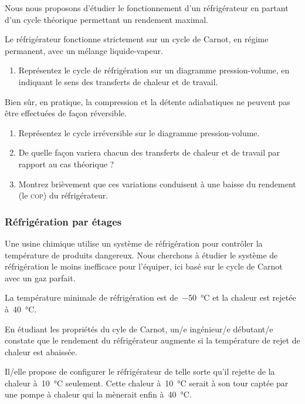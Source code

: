 	Nous nous proposons d’étudier le fonctionnement d’un réfrigérateur en partant d’un cycle théorique permettant un rendement maximal.
	
	Le réfrigérateur fonctionne strictement sur un cycle de Carnot, en régime permanent, avec un mélange liquide-vapeur.
	
	\begin{enumerate}
		\item Représentez le cycle de réfrigération sur un diagramme pression-volume, en indiquant le sens des transferts de chaleur et de travail.
	\end{enumerate}
	
	Bien sûr, en pratique, la compression et la détente adiabatiques ne peuvent pas être effectuées de façon réversible.
	
	\begin{enumerate}
		\item Représentez le cycle irréversible sur le diagramme pression-volume.
		\item De quelle façon variera chacun des transferts de chaleur et de travail par rapport au cas théorique ?
		\item Montrez brièvement que ces variations conduisent à une baisse du rendement (le \textsc{cop}) du réfrigérateur.
	\end{enumerate}


\subsubsection{Réfrigération par étages}
\label{exo_refrigeration_etages}
\wherefrom{[DS n°2 2012, 7pts]}

	Une usine chimique utilise un système de réfrigération pour contrôler la température de produits dangereux. Nous cherchons à étudier le système de réfrigération le moins inefficace pour l’équiper, ici basé sur le cycle de Carnot avec un gaz parfait.
	
	La température minimale de réfrigération est de~\SI{-50}{\degreeCelsius} et la chaleur est rejetée à~\SI{40}{\degreeCelsius}.
			
	En étudiant les propriétés du cyle de Carnot, un/e ingénieur/e débutant/e constate que le rendement du réfrigérateur augmente si la température de rejet de chaleur est abaissée.
	
	Il/elle propose de configurer le réfrigérateur de telle sorte qu’il rejette de la chaleur à~\SI{10}{\degreeCelsius} seulement. Cette chaleur à~\SI{10}{\degreeCelsius} serait à son tour captée par une pompe à chaleur qui la mènerait enfin à~\SI{40}{\degreeCelsius}.
	
